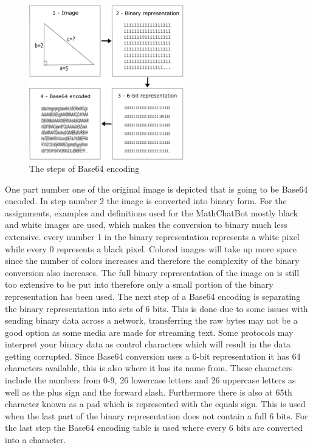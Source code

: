 \begin{figure}[H]
    \centering
    \includegraphics[width=0.6\textwidth]{figures/image1412.png}
    \caption{The steps of Base64 encoding \cite{DemoAPI}}
    \label{fig:base64_encoding}
\end{figure}

\noindent
One part number one of  the original image is depicted that is going to be Base64 encoded. In step number 2 the image is converted into binary form. For the assignments, examples and definitions used for the MathChatBot mostly black and white images are used, which makes the conversion to binary much less extensive. every number 1 in the binary representation represents a white pixel while every 0 represents a black pixel. Colored images will take up more space since the number of colors increases and therefore the complexity of the binary conversion also increases. The full binary representation of the image on  is still too extensive to be put into  therefore only a small portion of the binary representation has been used. The next step of a Base64 encoding is separating the binary representation into sets of 6 bits. This is done due to some issues with sending binary data across a network, transferring the raw bytes may not be a good option as some media are made for streaming text. Some protocols may interpret your binary data as control characters which will result in the data getting corrupted. Since Base64 conversion uses a 6-bit representation it has 64 characters available, this is also where it has its name from. These characters include the numbers from 0-9, 26 lowercase letters and 26 uppercase letters as well as the plus sign and the forward slash. Furthermore there is also at 65th character known as a pad which is represented with the equals sign. This is used when the last part of the binary representation does not contain a full 6 bits. For the last step the Base64 encoding table is used where every 6 bits are converted into a character\cite{HeinzTschabitscher2019HowWorks}.


